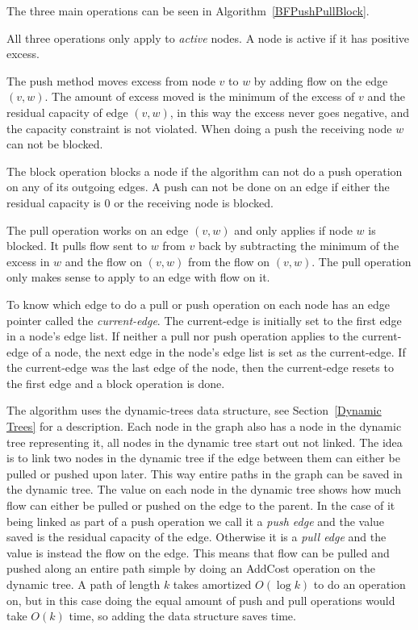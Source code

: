 The three main operations can be seen in Algorithm~\ref{BFPushPullBlock}.

All three operations only apply to \emph{active} nodes. A node is active if it has positive excess.

The push method moves excess from node $v$ to $w$ by adding flow on the edge $(v,w)$. The amount of excess moved is the minimum of the excess of $v$ and the
residual capacity of edge $(v,w)$, in this way the excess never goes negative, and the capacity constraint is not violated. 
When doing a push the receiving node $w$ can not be blocked.

The block operation blocks a node if the algorithm can not do a push operation on any of its outgoing edges. A push can not be done on an edge if either the residual 
capacity is 0 or the receiving node is blocked.

The pull operation works on an edge $(v,w)$ and only applies if node $w$ is blocked. It pulls flow sent to $w$ from $v$ back by subtracting
the minimum of the excess in $w$ and the flow on $(v,w)$ from the flow on $(v,w)$. The pull operation only makes sense to apply to an edge with flow on it.

To know which edge to do a pull or push operation on each node has an edge pointer called the \emph{current-edge}. The current-edge is initially
set to the first edge in a node's edge list. If neither a pull nor push operation applies to the current-edge of a node, the next edge in the node's edge list
is set as the current-edge. If the current-edge was the last edge of the node, then the current-edge resets to the first edge and a block operation is done.

The algorithm uses the dynamic-trees data structure, see Section~\ref{Dynamic Trees} for a description. Each node in the graph also has a node in the dynamic
tree representing it, all nodes in the dynamic tree start out not linked. The idea is to link two nodes in the dynamic tree if the edge between them can either 
be pulled or pushed upon later. This way entire paths in the graph can be saved in the dynamic tree. The value on each node in the dynamic tree shows how much flow 
can either be pulled or pushed on the edge to the parent. 
In the case of it being linked as part of a push operation we call it a \emph{push edge} and the value saved is the residual capacity of the edge. 
Otherwise it is a \emph{pull edge} and the value is instead the flow on the edge. 
This means that flow can be pulled and pushed along an entire path simple by doing an AddCost operation on the dynamic tree.
A path of length $k$ takes amortized $O(\log{k})$ to do an operation on, but in this case doing the equal amount of push and pull operations would take $O(k)$ time,
so adding the data structure saves time.

